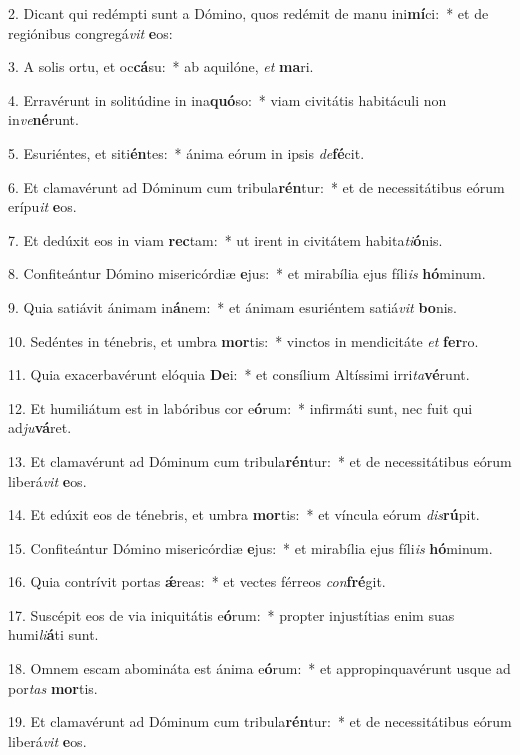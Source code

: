 2. Dicant qui redémpti sunt a Dómino, quos redémit de manu ini\textbf{mí}ci:~*  et de regiónibus congregá\textit{vit} \textbf{e}os:\

3. A solis ortu, et oc\textbf{cá}su:~*  ab aquilóne, \textit{et} \textbf{ma}ri.\

4. Erravérunt in solitúdine in ina\textbf{quó}so:~*  viam civitátis habitáculi non in\textit{ve}\textbf{né}runt.\

5. Esuriéntes, et siti\textbf{én}tes:~*  ánima eórum in ipsis \textit{de}\textbf{fé}cit.\

6. Et clamavérunt ad Dóminum cum tribula\textbf{rén}tur:~*  et de necessitátibus eórum erípu\textit{it} \textbf{e}os.\

7. Et dedúxit eos in viam \textbf{rec}tam:~*  ut irent in civitátem habita\textit{ti}\textbf{ó}nis.\

8. Confiteántur Dómino misericórdiæ \textbf{e}jus:~*  et mirabília ejus fíli\textit{is} \textbf{hó}minum.\

9. Quia satiávit ánimam in\textbf{á}nem:~*  et ánimam esuriéntem satiá\textit{vit} \textbf{bo}nis.\

10. Sedéntes in ténebris, et umbra \textbf{mor}tis:~*  vinctos in mendicitáte \textit{et} \textbf{fer}ro.\

11. Quia exacerbavérunt elóquia \textbf{De}i:~*  et consílium Altíssimi irri\textit{ta}\textbf{vé}runt.\

12. Et humiliátum est in labóribus cor e\textbf{ó}rum:~*  infirmáti sunt, nec fuit qui ad\textit{ju}\textbf{vá}ret.\

13. Et clamavérunt ad Dóminum cum tribula\textbf{rén}tur:~*  et de necessitátibus eórum liberá\textit{vit} \textbf{e}os.\

14. Et edúxit eos de ténebris, et umbra \textbf{mor}tis:~*  et víncula eórum \textit{dis}\textbf{rú}pit.\

15. Confiteántur Dómino misericórdiæ \textbf{e}jus:~*  et mirabília ejus fíli\textit{is} \textbf{hó}minum.\

16. Quia contrívit portas \textbf{ǽ}reas:~*  et vectes férreos \textit{con}\textbf{fré}git.\

17. Suscépit eos de via iniquitátis e\textbf{ó}rum:~*  propter injustítias enim suas humi\textit{li}\textbf{á}ti sunt.\

18. Omnem escam abomináta est ánima e\textbf{ó}rum:~*  et appropinquavérunt usque ad por\textit{tas} \textbf{mor}tis.\

19. Et clamavérunt ad Dóminum cum tribula\textbf{rén}tur:~*  et de necessitátibus eórum liberá\textit{vit} \textbf{e}os.\

